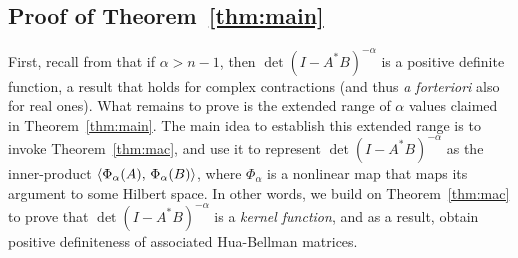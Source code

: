 \documentclass[11pt]{article}
\begin{document}
\subsection{Proof of Theorem~\ref{thm:main}}
First, recall from \citep{hua1955} that if $\alpha > n-1$, then $\det(I-A^*B)^{-\alpha}$ is a positive definite function, a result that holds for complex contractions (and thus \emph{a forteriori} also for real ones). What remains to prove is the extended range of $\alpha$ values claimed in Theorem~\ref{thm:main}. The main idea to establish this extended range is to invoke Theorem~\ref{thm:mac}, and use it to represent $\det(I-A^*B)^{-\alpha}$ as the inner-product $ \langle {\Phi_\alpha(A)},\, {\Phi_\alpha(B)} \rangle$, where $\Phi_\alpha$ is a  nonlinear map that maps its argument to some Hilbert space. In other words, we build on Theorem~\ref{thm:mac} to prove that $\det(I-A^*B)^{-\alpha}$ is a \emph{kernel function}, and as a result, obtain positive definiteness of associated Hua-Bellman matrices. 
\end{document}
